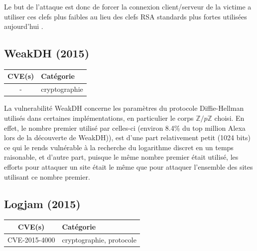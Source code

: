 Le but de l'attaque est donc de forcer la connexion client/serveur de la victime a utiliser ces clefs plus faibles au lieu des clefs RSA standards plus fortes utilisées aujourd'hui \cite{freak}.




\subsection{WeakDH (2015)}

\begin{tabularx}{0.96\textwidth}{|c|X|}
  \hline
  \textbf{CVE(s)} & \textbf{Catégorie} \\
  \hline
  - & cryptographie \\
  \hline
\end{tabularx}

\vspace{1em}

La vulnerabilité WeakDH concerne les paramètres du protocole Diffie-Hellman utilisés dans certaines implémentations, en particulier le corps $\mathbb{Z}/p\mathbb{Z}$ choisi. En effet, le nombre premier utilisé par celles-ci (environ 8.4\% du top million Alexa lors de la découverte de WeakDH)), est d'une part relativement petit (1024 bits) ce qui le rends vulnérable à la recherche du logarithme discret en un temps raisonable, et d'autre part, puisque le même nombre premier était utilisé, les efforts pour attaquer un site était le même que pour attaquer l'ensemble des sites utilisant ce nombre premier\cite{weakdh}.




\subsection{Logjam (2015)}

\begin{tabularx}{0.96\textwidth}{|c|X|}
  \hline
  \textbf{CVE(s)} & \textbf{Catégorie} \\
  \hline
  CVE-2015-4000 & cryptographie, protocole \\
  \hline
\end{tabularx}

\vspace{1em}

